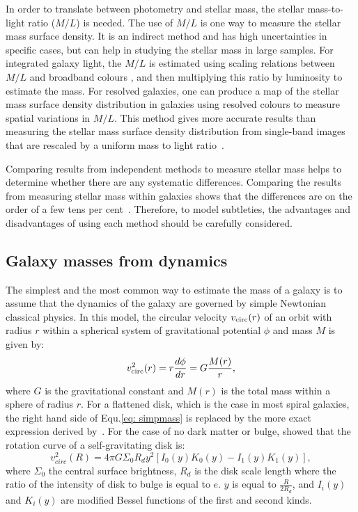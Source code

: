 In order to translate between photometry and stellar mass, the stellar mass-to-light ratio ($M/L$) is needed.
The use of $M/L$ is one way to measure the stellar mass surface density. 
It is an indirect method and has high uncertainties in specific cases, but can help in studying the stellar mass in large samples. 
For integrated galaxy light, the $M/L$ is estimated using scaling relations between $M/L$ and broadband colours \citep[e.g.][]{Bell03}, and then multiplying this ratio by luminosity to estimate the mass.
For resolved galaxies, one can produce a map of the stellar mass surface density distribution in galaxies using resolved colours to measure spatial variations in $M/L$.
This method gives more accurate results than measuring the stellar mass surface density distribution from single-band images that are rescaled by a uniform mass to light ratio~\citep{Zibetti09}.

Comparing results from independent methods to measure stellar mass helps to determine whether there are any systematic differences.
Comparing the results from measuring stellar mass within galaxies shows that the differences are on the order of a few tens per cent~\citep{McLaughlin05}.
Therefore, to model subtleties, the advantages and disadvantages of using each method should be carefully considered. 


\subsection{Galaxy masses from dynamics}

The simplest and the most common way to estimate the mass of a galaxy is to assume that the dynamics of the galaxy are governed by simple Newtonian classical physics.
In this model, the circular velocity $v_{\rm circ}(r)$ of an orbit with radius $r$ within a spherical system of gravitational potential $\phi$ and mass $M$ is given by:
\begin{equation}
\label{eq: simpmass}
v^2_{\rm circ}(r)=r\frac{d\phi}{dr} = G\frac{M(r)}{r},
\end{equation}
where $G$ is the gravitational constant and $M(r)$ is the total mass within a sphere of radius $r$. 
For a flattened disk, which is the case in most spiral galaxies, the right hand side of Equ.\ref{eq: simpmass} is replaced by the more exact expression derived by~\cite{Freeman70}. 
For the case of no dark matter or bulge, \cite{Freeman70} showed that the rotation curve of a self-gravitating disk is:
\begin{equation}
v^2_{circ}(R)= 4\pi G \Sigma_{0}R_{d} y^2[I_0(y)K_0(y) - I_1(y)K_1(y)],
\end{equation}
where $\Sigma_0$ the central surface brightness, $R_d$ is the disk scale length where the ratio of the intensity of disk to bulge is equal to $e$.%
$y$ is equal to $\frac{R}{2R_d}$, and $I_i(y)$ and $K_i(y)$ are  modified Bessel functions of the first and second kinds. 


